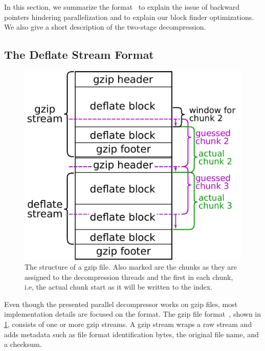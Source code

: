 In this section, we summarize the  format~\cite{RFC1951} to explain the issue of backward pointers hindering parallelization and to explain our block finder optimizations.
We also give a short description of the two-stage  decompression.

\subsection{The Deflate Stream Format}

\begin{figure}
    \centering
    \includegraphics[width=0.5\linewidth]{figures/gzip-file}
    \caption{
        The structure of a gzip file. Also marked are the chunks as they are assigned to the decompression threads and the first  in each chunk, i.e, the actual chunk start as it will be written to the index.
    }
    \label{fig:gzip-file}
\end{figure}

Even though the presented parallel decompressor works on gzip files, most implementation details are focused on the  format.
The gzip file format~\cite{RFC1952}, shown in \cref{fig:gzip-file}, consists of one or more gzip streams.
A gzip stream wraps a raw  stream and adds metadata such as file format identification bytes, the original file name, and a checksum.

